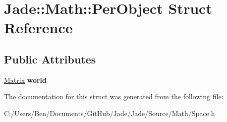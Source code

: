 \hypertarget{struct_jade_1_1_math_1_1_per_object}{}\section{Jade\+:\+:Math\+:\+:Per\+Object Struct Reference}
\label{struct_jade_1_1_math_1_1_per_object}
\subsection*{Public Attributes}
\begin{DoxyCompactItemize}
\item 
\hypertarget{struct_jade_1_1_math_1_1_per_object_ab6e1f936ada0c7d91e330a6a1f102083}{}\hyperlink{struct_jade_1_1_math_1_1_matrix}{Matrix} {\bfseries world}\label{struct_jade_1_1_math_1_1_per_object_ab6e1f936ada0c7d91e330a6a1f102083}

\end{DoxyCompactItemize}


The documentation for this struct was generated from the following file\+:\begin{DoxyCompactItemize}
\item 
C\+:/\+Users/\+Ben/\+Documents/\+Git\+Hub/\+Jade/\+Jade/\+Source/\+Math/Space.\+h\end{DoxyCompactItemize}
